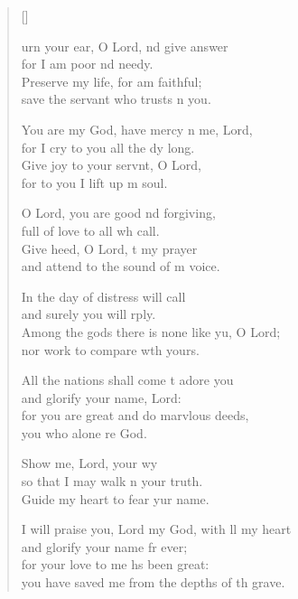 \settowidth{\versewidth}{I will praise you, Lord my God, with all my heart}
\begin{verse}[\versewidth]
  \begin{patverse}
urn your ear, O Lord, nd give answer\Med\\
for I am poor nd needy.\\
Preserve my life, for  am faithful;\Med\\
save the servant who trusts \pointup{\i}n you.

You are my God, have mercy n me, Lord,\Med\\
for I cry to you all the dy long.\\
Give joy to your servnt, O Lord,\Med\\
for to you I lift up m soul.

O Lord, you are good nd forgiving,\Med\\
full of love to all wh call.\\
Give heed, O Lord, t my prayer\Med\\
and attend to the sound of m voice.

In the day of distress  will call\Med\\
and surely you will rply.\\
Among the gods there is none like yu, O Lord;\Med\\
nor work to compare w\pointup{\i}th yours.

All the nations shall come t adore you\Med\\
and glorify your name,  Lord:\\
for you are great and do marvlous deeds,\Med\\
you who alone re God.

Show me, Lord, your wy\Flex\\
so that I may walk n your truth.\Med\\
Guide my heart to fear yur name.

I will praise you, Lord my God, with ll my heart\Med\\
and glorify your name fr ever;\\
for your love to me hs been great:\Med\\
you have saved me from the depths of th grave.


\end{patverse}
\end{verse}
